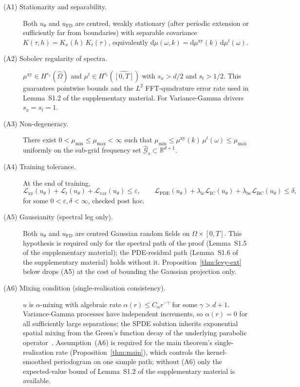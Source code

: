 \documentclass[review,12pt]{elsarticle}
\begin{document}
\begin{description}
\item[(A1) Stationarity and separability.] Both \(u_\theta\) and
\(u_{\mathrm{FD}}\) are centred, weakly stationary (after periodic
extension or sufficiently far from boundaries) with separable
covariance \(K(\tau, h) = K_x(h)\,K_t(\tau)\), equivalently
\(\mathrm d\mu(\omega, k) = \mathrm d\mu^{\mathrm{xy}}(k)\,
\mathrm d\mu^t(\omega)\).

\item[(A2) Sobolev regularity of spectra.]
\(\mu^{\mathrm{xy}} \in H^{s_x}(\widehat\Omega)\) and
\(\mu^t \in H^{s_t}(\widehat{[0,T]})\) with \(s_x > d/2\) and
\(s_t > 1/2\). This guarantees pointwise bounds and the \(L^2\)
FFT-quadrature error rate used in Lemma~S1.2 of the supplementary material.
For Variance-Gamma drivers \(s_x = s_t = 1\).

\item[(A3) Non-degeneracy.] There exist
\(0 < \mu_{\min} \le \mu_{\max} < \infty\) such that
\(\mu_{\min} \le \mu^{\mathrm{xy}}(k)\,\mu^t(\omega) \le \mu_{\max}\)
uniformly on the sub-grid frequency set
\(\widehat{\mathcal G}_s \subset \mathbb R^{d+1}\).

\item[(A4) Training tolerance.] At the end of training,
\begin{equation}
\mathcal L_{\mathrm{xy}}(u_\theta) + \mathcal L_t(u_\theta)
+ \mathcal L_{\mathrm{var}}(u_\theta) \le \varepsilon, \qquad
\mathcal L_{\mathrm{PDE}}(u_\theta)
+ \lambda_{\mathrm{ic}}\mathcal L_{\mathrm{IC}}(u_\theta)
+ \lambda_{\mathrm{bc}}\mathcal L_{\mathrm{BC}}(u_\theta)
\le \delta,
\label{eq:tolerance}
\end{equation}
for some \(0 < \varepsilon, \delta < \infty\), checked post hoc.

\item[(A5) Gaussianity (spectral leg only).] Both \(u_\theta\) and
\(u_{\mathrm{FD}}\) are centred Gaussian random fields on
\(\Omega \times [0,T]\). This hypothesis is required only for the
spectral path of the proof (Lemma~S1.5 of the supplementary material); the
PDE-residual path (Lemma~S1.6 of the supplementary material) holds without it.
Proposition~\ref{thm:levy-ext} below drops (A5) at the cost of
bounding the Gaussian projection only.

\item[(A6) Mixing condition (single-realisation consistency).]
\(u\) is \(\alpha\)-mixing with algebraic rate
\(\alpha(r) \le C_\alpha r^{-\gamma}\) for some \(\gamma > d+1\).
Variance-Gamma processes have independent increments, so
\(\alpha(r) = 0\) for all sufficiently large separations; the SPDE
solution inherits exponential spatial mixing from the Green's
function decay of the underlying parabolic operator~\cite{ContTankov2003}.
Assumption~(A6) is required for the main theorem's
single-realisation rate (Proposition~\ref{thm:main}), which controls
the kernel-smoothed periodogram on one sample path; without (A6)
only the expected-value bound of Lemma~S1.2 of the supplementary material is
available.


\end{description}
\end{document}
